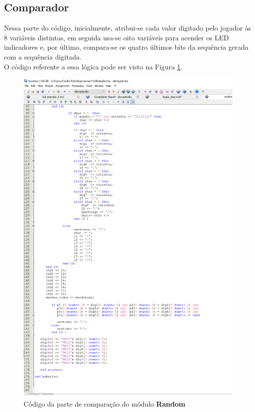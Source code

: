 \documentclass[14pt, oneside]{book}
\newcommand\tab[1][1cm]{\hspace*{#1}}
\theoremstyle{definition}
\begin{document}
                
                \subsection{Comparador}
                    \tab Nessa parte do código, inicialmente, atribui-se cada valor digitado pelo jogador às 8 variáveis distintas, em seguida usa-se oito variáveis para acender os LED indicadores e, por último, compara-se os quatro últimos bits da sequência gerada com a sequência digitada. \\
                    \tab O código referente a essa lógica pode ser visto na Figura \ref{random_comparador}.\\
                    
                    \begin{figure}[H]
                     \centering                    \includegraphics[scale=0.6]{random_comparador.png}
                     \caption{Código da parte de comparação do módulo \textbf{Random}}
                     \label{random_comparador}
                    \end{figure} \\
                
\end{document}

